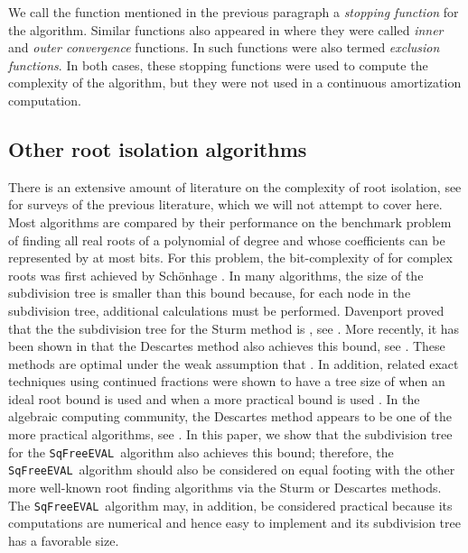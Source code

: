 \documentclass{amsart}
\theoremstyle{definition}
\newcommand{\EVAL}{\texttt{SqFreeEVAL}}
\begin{document}
We call the function  mentioned in the previous paragraph a {\em stopping function} for the algorithm.  Similar functions also appeared in \citep{Henrici:search:70} where they were called {\em inner} and {\em outer convergence} functions.  In \citep{Yakoubsohn:bisection:05} such functions were also termed {\em exclusion functions}.  In both cases, these stopping functions were used to compute the complexity of the algorithm, but they were not used in a continuous amortization computation.

\subsection{Other root isolation algorithms}\label{Intro:RootsFinding}
There is an extensive amount of literature on the complexity of root isolation, see \citep{pan:history-progress:97,Pan1996} for surveys of the previous literature, which we will not attempt to cover here.  Most algorithms are compared by their performance on the benchmark problem of finding all real roots of a polynomial of degree  and whose coefficients can be represented by at most  bits.  For this problem, the bit-complexity of  for complex roots
was first achieved by Sch\"onhage \citep{schonhage:fundamental}.  In many algorithms, the size of the subdivision tree is smaller than this bound because, for each node in the subdivision tree, additional calculations must be performed.  Davenport \citep{davenport:85} proved that the the subdivision tree for the Sturm method is , see \citep{reischert:subresultant:97,lickteig-roy:sequences:01,du-sharma-yap:sturm:07}.  More recently, it has been shown in \citep{eigenwillig-sharma-yap:descartes:06} that the Descartes method also achieves this bound, see \citep{collins-akritas:76,eigenwillig-sharma-yap:descartes:06,krandick-mehlhorn:06,collins-johnson-krandick:cad:02}.  These methods are optimal under the weak assumption that .  In addition, related exact techniques using continued fractions were shown to have a tree size of  when an ideal root bound is used and  when a more practical bound is used \citep{sharma:2008}. In the algebraic computing community, the Descartes method appears to be one of the more practical algorithms, see \citep{collins-johnson-krandick:cad:02,johnson:root-isolation:98,rouillier-zimmermann:roots:04,mrr:bernstein:05,rouillier-zimmermann:roots:04}.  In this paper, we show that the subdivision tree for the \EVAL\ algorithm also achieves this bound; therefore, the \EVAL\ algorithm should also be considered on equal footing with the other more well-known root finding algorithms via the Sturm or Descartes methods.  The \EVAL\ algorithm may, in addition, be considered practical because its computations are numerical and hence easy to implement and its subdivision tree has a favorable size.
\end{document}
